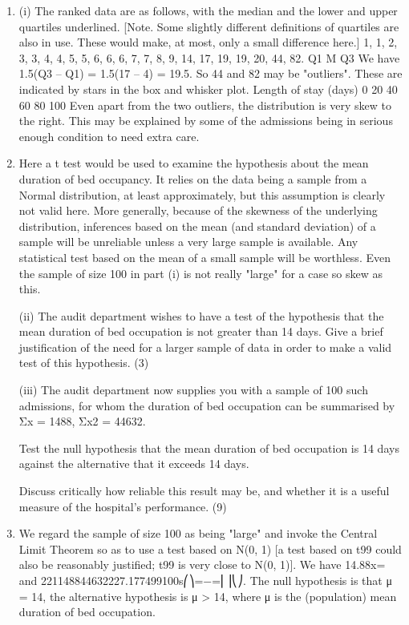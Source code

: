 \documentclass[a4paper,12pt]{article}
\begin{document}
\begin{enumerate}
\item 
(i) The ranked data are as follows, with the median and the lower and upper quartiles underlined. [Note. Some slightly different definitions of quartiles are also in use. These would make, at most, only a small difference here.]
1, 1, 2, 3, 3, 4, 4, 5, 5, 6, 6, 6, 7, 7, 8, 9, 14, 17, 19, 19, 20, 44, 82.
Q1 M Q3
We have 1.5(Q3 – Q1) = 1.5(17 – 4) = 19.5. So 44 and 82 may be "outliers". These are indicated by stars in the box and whisker plot.
Length of
stay (days)
0
20
40
60
80
100
Even apart from the two outliers, the distribution is very skew to the right. This may be explained by some of the admissions being in serious enough condition to need extra care.
\item  Here a t test would be used to examine the hypothesis about the mean duration of bed occupancy. It relies on the data being a sample from a Normal distribution, at least approximately, but this assumption is clearly not valid here. More generally, because of the skewness of the underlying distribution, inferences based on the mean (and standard deviation) of a sample will be unreliable unless a very large sample is available. Any statistical test based on the mean of a small sample will be worthless. Even the sample of size 100 in part (i) is not really "large" for a case so skew as this.
\newpage 
\begin{framed}
(ii) The audit department wishes to have a test of the hypothesis that the mean duration of bed occupation is not greater than 14 days.  Give a brief justification of the need for a larger sample of data in order to make a valid test of this hypothesis. (3) 
 
(iii) The audit department now supplies you with a sample of 100 such admissions, for whom the duration of bed occupation can be summarised by 
 Σx = 1488,   Σx2 = 44632. 
 
Test the null hypothesis that the mean duration of bed occupation is 14 days against the alternative that it exceeds 14 days. 
 
Discuss critically how reliable this result may be, and whether it is a useful measure of the hospital's performance. (9) 
 \end{framed}
 \item  We regard the sample of size 100 as being "large" and invoke the Central Limit Theorem so as to use a test based on N(0, 1) [a test based on t99 could also be reasonably justified; t99 is very close to N(0, 1)].
We have 14.88x= and 221148844632227.177499100s⎛⎞=−=⎜⎟⎝⎠.
The null hypothesis is that μ = 14, the alternative hypothesis is μ > 14, where μ is the (population) mean duration of bed occupation.


\end{enumerate}
\end{document}
